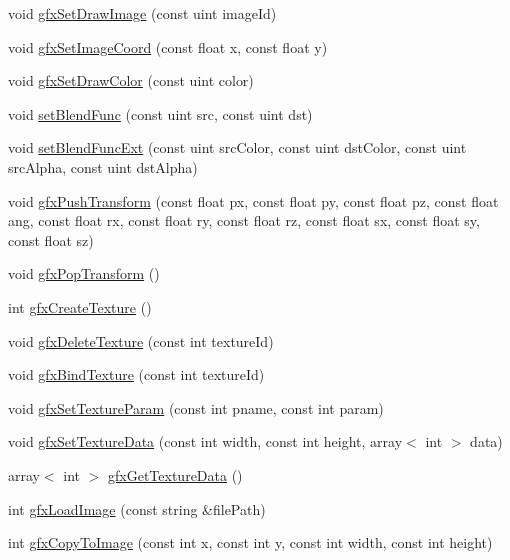 \begin{DoxyCompactItemize}
\item 
void \hyperlink{class_graphics_a37171416216a1987acd0bb1151305d24}{gfx\+Set\+Draw\+Image} (const uint image\+Id)
\item 
void \hyperlink{class_graphics_a4776704155fae941c1e00b728c4c1273}{gfx\+Set\+Image\+Coord} (const float x, const float y)
\item 
void \hyperlink{class_graphics_a572da31bea4f52560a79c9f8995efe07}{gfx\+Set\+Draw\+Color} (const uint color)
\item 
void \hyperlink{class_graphics_a7879ec3e855fe3603b905445478d43d4}{set\+Blend\+Func} (const uint src, const uint dst)
\item 
void \hyperlink{class_graphics_a95d1adf7b032a77c317cdbf58706f4e1}{set\+Blend\+Func\+Ext} (const uint src\+Color, const uint dst\+Color, const uint src\+Alpha, const uint dst\+Alpha)
\item 
void \hyperlink{class_graphics_a3afd1604ee96613fdd9abe048d7b155d}{gfx\+Push\+Transform} (const float px, const float py, const float pz, const float ang, const float rx, const float ry, const float rz, const float sx, const float sy, const float sz)
\item 
void \hyperlink{class_graphics_a42c1a339802e83ae73a6ed70bf02dba3}{gfx\+Pop\+Transform} ()
\item 
int \hyperlink{class_graphics_a0fa0ae6b61b9e8316d7f57232e7c42b6}{gfx\+Create\+Texture} ()
\item 
void \hyperlink{class_graphics_a73109350ad6cf05fbfde94272788305f}{gfx\+Delete\+Texture} (const int texture\+Id)
\item 
void \hyperlink{class_graphics_a721d597b712edd462fa38698e0843340}{gfx\+Bind\+Texture} (const int texture\+Id)
\item 
void \hyperlink{class_graphics_a18273ab11c76bd76effd4f19ae1f2b6d}{gfx\+Set\+Texture\+Param} (const int pname, const int param)
\item 
void \hyperlink{class_graphics_ab60f972ec484c0403eef31f923d8e38f}{gfx\+Set\+Texture\+Data} (const int width, const int height, array$<$ int $>$ data)
\item 
array$<$ int $>$ \hyperlink{class_graphics_a69728de0b6e16d77aa7552cb6abd7890}{gfx\+Get\+Texture\+Data} ()
\item 
int \hyperlink{class_graphics_ab2e439f6d42eb345b826901769238af7}{gfx\+Load\+Image} (const string \&file\+Path)
\item 
int \hyperlink{class_graphics_af086b4d98dad87d82fe34b5afa2436fb}{gfx\+Copy\+To\+Image} (const int x, const int y, const int width, const int height)

\end{DoxyCompactItemize}
